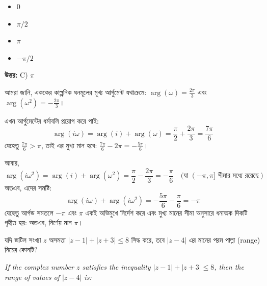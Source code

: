 \documentclass[12pt, a4paper]{article}
\begin{document}
\begin{itemize}[label={}, leftmargin=1cm, itemsep=0.5em]
    \item[\textbf{A)}] $0$
    \item[\textbf{B)}] $\pi/2$
    \item[\textbf{C)}] $\pi$
    \item[\textbf{D)}] $-\pi/2$
\end{itemize}

\vspace{0.5em}
\begin{tcolorbox}[answerbox]
    \textbf{\color{success} উত্তর:} C) $\pi$
\end{tcolorbox}
\vspace{1em}

\begin{tcolorbox}[solutionbox={সমাধান (Solution)}]
    \noindent
    আমরা জানি, এককের কাল্পনিক ঘনমূলের মুখ্য আর্গুমেন্ট যথাক্রমে: $\arg(\omega) = \frac{2\pi}{3}$ এবং $\arg(\omega^2) = -\frac{2\pi}{3}$। 
    
    এখন আর্গুমেন্টের ধর্মাবলি প্রয়োগ করে পাই:
    \[ \arg(i\omega) = \arg(i) + \arg(\omega) = \frac{\pi}{2} + \frac{2\pi}{3} = \frac{7\pi}{6} \]
    যেহেতু $\frac{7\pi}{6} > \pi$, তাই এর মুখ্য মান হবে: $\frac{7\pi}{6} - 2\pi = -\frac{5\pi}{6}$। 
    
    আবার, 
    \[ \arg(i\omega^2) = \arg(i) + \arg(\omega^2) = \frac{\pi}{2} - \frac{2\pi}{3} = -\frac{\pi}{6} \quad (\text{যা } (-\pi, \pi] \text{ সীমার মধ্যে রয়েছে}) \]
    অতএব, এদের সমষ্টি:
    \[ \arg(i\omega) + \arg(i\omega^2) = -\frac{5\pi}{6} - \frac{\pi}{6} = -\pi \]
    যেহেতু আর্গন্ড সমতলে $-\pi$ এবং $\pi$ একই অভিমুখে নির্দেশ করে এবং মুখ্য মানের সীমা অনুসারে ধনাত্মক দিকটি গৃহীত হয়: অতএব, নির্ণেয় মান $\pi$।
\end{tcolorbox}
\begin{tcolorbox}[questionbox={প্রশ্ন (Question) 16}]
    \noindent
    যদি জটিল সংখ্যা $z$ অসমতা $|z - 1| + |z + 3| \leq 8$ সিদ্ধ করে, তবে $|z - 4|$ এর মানের পরম পাল্লা (range) নিচের কোনটি?
    
    \vspace{0.8em}
    \begin{english}
    \noindent\textit{\color{darkgray}
    If the complex number $z$ satisfies the inequality $|z - 1| + |z + 3| \leq 8$, then the range of values of $|z - 4|$ is:
    }
    \end{english}
\end{tcolorbox}
\end{document}
